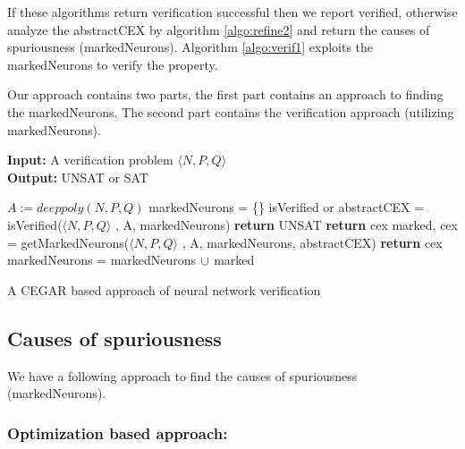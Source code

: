 If these algorithms return verification successful then we report verified,
otherwise analyze the abstractCEX by algorithm \ref{algo:refine2} and return the causes of spuriousness (markedNeurons). 
Algorithm \ref{algo:verif1} exploits the markedNeurons to verify the property. 

Our approach contains two parts, the first part contains an approach to finding the markedNeurons. 
The second part contains the verification approach (utilizing markedNeurons).

\begin{algorithm}[t]
  \textbf{Input: } A verification problem $\langle N,P,Q \rangle$ \\
  \textbf{Output: } UNSAT or SAT
  \begin{algorithmic}[1]
    \State $A := deeppoly(N,P,Q)$
    \State markedNeurons = \{\}
      \State isVerified or abstractCEX = isVerified($\langle N,P,Q \rangle$ , A, markedNeurons)
        \State \textbf{return} UNSAT
      \Else
          \State \textbf{return} cex
        \Else
          \State marked, cex = getMarkedNeurons($\langle N,P,Q \rangle$ , A, markedNeurons, abstractCEX)
            \State \textbf{return} cex
          \EndIf
          \State markedNeurons = markedNeurons ${\cup}$ marked
        \EndIf
      \EndIf
    \EndWhile
  \end{algorithmic}
  \caption{A CEGAR based approach of neural network verification}
  \label{algo:main}
\end{algorithm}

\subsection{Causes of spuriousness} 
We have a following approach to find the causes of spuriousness (markedNeurons). 

\subsubsection{Optimization based approach: }

